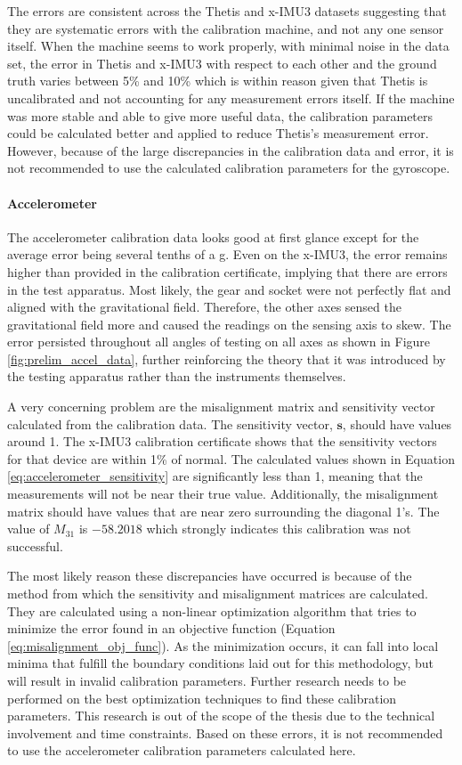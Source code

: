 The errors are consistent across the Thetis and x-IMU3 datasets suggesting that they are systematic errors with the calibration machine, and not any one sensor itself.
When the machine seems to work properly, with minimal noise in the data set, the error in Thetis and x-IMU3 with respect to each other and the ground truth varies between 5\% and 10\% which is within reason given that Thetis is uncalibrated and not accounting for any measurement errors itself.
If the machine was more stable and able to give more useful data, the calibration parameters could be calculated better and applied to reduce Thetis's measurement error.
However, because of the large discrepancies in the calibration data and error, it is not recommended to use the calculated calibration parameters for the gyroscope.

\paragraph*{Accelerometer} The accelerometer calibration data looks good at first glance except for the average error being several tenths of a g.
Even on the x-IMU3, the error remains higher than provided in the calibration certificate, implying that there are errors in the test apparatus.
Most likely, the gear and socket were not perfectly flat and aligned with the gravitational field.
Therefore, the other axes sensed the gravitational field more and caused the readings on the sensing axis to skew.
The error persisted throughout all angles of testing on all axes as shown in Figure \ref{fig:prelim_accel_data}, further reinforcing the theory that it was introduced by the testing apparatus rather than the instruments themselves.

A very concerning problem are the misalignment matrix and sensitivity vector calculated from the calibration data.
The sensitivity vector, $\pmb{s}$, should have values around 1.
The x-IMU3 calibration certificate shows that the sensitivity vectors for that device are within 1\% of normal.
The calculated values shown in Equation \ref{eq:accelerometer_sensitivity} are significantly less than 1, meaning that the measurements will not be near their true value.
Additionally, the misalignment matrix should have values that are near zero surrounding the diagonal 1's.
The value of $M_{31}$ is $-58.2018$ which strongly indicates this calibration was not successful.

The most likely reason these discrepancies have occurred is because of the method from which the sensitivity and misalignment matrices are calculated.
They are calculated using a non-linear optimization algorithm that tries to minimize the error found in an objective function (Equation \ref{eq:misalignment_obj_func}).
As the minimization occurs, it can fall into local minima that fulfill the boundary conditions laid out for this methodology, but will result in invalid calibration parameters.
Further research needs to be performed on the best optimization techniques to find these calibration parameters.
This research is out of the scope of the thesis due to the technical involvement and time constraints.
Based on these errors, it is not recommended to use the accelerometer calibration parameters calculated here.

